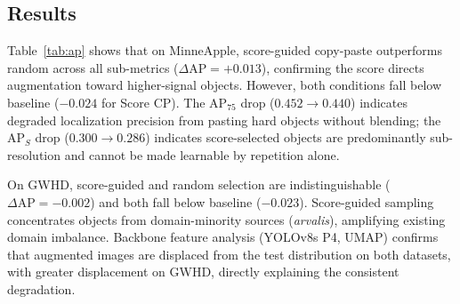 \documentclass[conference]{IEEEtran}
\begin{document}
\subsection{Results}

Table~\ref{tab:ap} shows that on MinneApple, score-guided copy-paste
outperforms random across all sub-metrics ($\Delta\mathrm{AP}
{=}{+}0.013$), confirming the score directs augmentation toward
higher-signal objects. However, both conditions fall below baseline
($-0.024$ for Score CP). The AP$_{75}$ drop ($0.452{\to}0.440$)
indicates degraded localization precision from pasting hard objects
without blending; the AP$_S$ drop ($0.300{\to}0.286$) indicates
score-selected objects are predominantly sub-resolution and cannot be
made learnable by repetition alone.

On GWHD, score-guided and random selection are indistinguishable
($\Delta\mathrm{AP}{=}{-}0.002$) and both fall below baseline
($-0.023$). Score-guided sampling concentrates objects from
domain-minority sources (\textit{arvalis}), amplifying existing domain
imbalance. Backbone feature analysis (YOLOv8s P4, UMAP) confirms that
augmented images are displaced from the test distribution on both
datasets, with greater displacement on GWHD, directly explaining the
consistent degradation.

\begin{table}[t]
\centering
\caption{Three-seed mean COCO AP. \textbf{Bold} = best copy-paste
  condition per dataset.}
\label{tab:ap}
\end{table}
\end{document}
